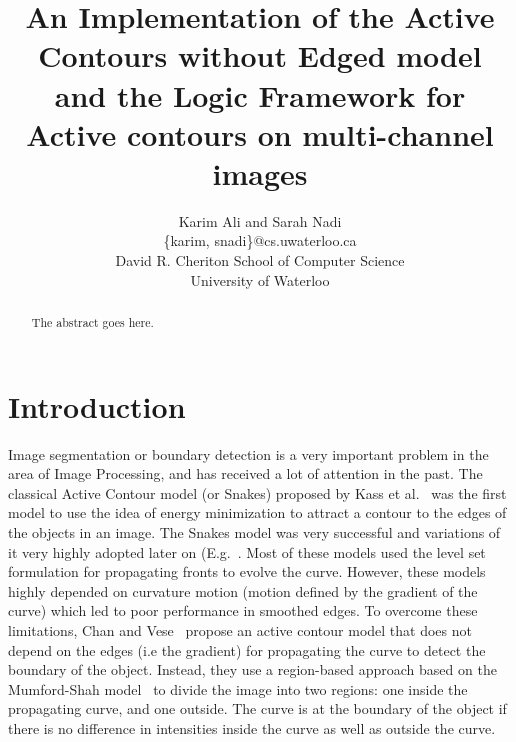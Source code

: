 \documentclass[10pt,twocolumn,letterpaper]{article}
\begin{document}
\title{An Implementation of the Active Contours without Edged model and the Logic Framework for Active contours on multi-channel images}

\author{Karim Ali and Sarah Nadi\\
\{karim, snadi\}@cs.uwaterloo.ca \\
David R. Cheriton School of Computer Science\\
University of Waterloo\\
}



\maketitle

\begin{abstract}
The abstract goes here.
\end{abstract}



\section{Introduction}
Image segmentation or boundary detection is a very important problem in the area of Image Processing, and has received a lot of attention in the past. The
classical Active Contour model (or Snakes) proposed by Kass et al.~\cite{kass1988snakes} was the first model to use the idea of energy minimization to attract
a contour to the edges of the objects in an image. The Snakes model was very successful and variations of it very highly adopted later on
(E.g.~\cite{caselles1997geodesic}. Most of these models used the level set formulation for propagating fronts to evolve the curve. However, these models highly
depended on curvature motion (motion defined by the gradient of the curve) which led to poor performance in smoothed edges. To overcome these limitations, Chan
and Vese~\cite{chan2001active} propose an active contour model that does not depend on the edges (i.e the gradient) for propagating the curve to detect the
boundary of the object. Instead, they use a region-based approach based on the Mumford-Shah model~\cite{mumford1989optimal} to divide the image
into two regions: one inside the propagating curve, and one outside. The curve is at the boundary of the object if there is no difference in intensities inside
the curve as well as outside the curve.
\end{document}
